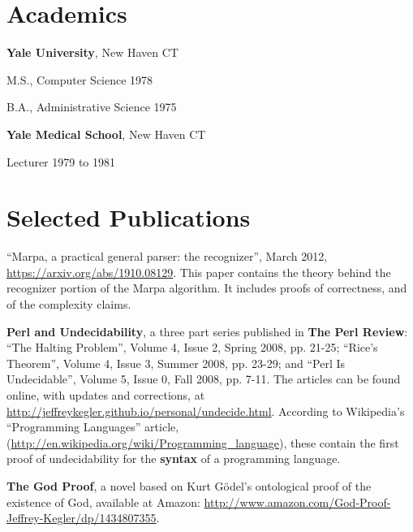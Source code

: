 \documentclass[12pt,margin,line]{res}
\newcommand{\internalskip}{\vspace{-.15in}}
\newenvironment{mylist}{
  \begin{list}{}
  {%
      \setlength{\itemsep}{0in}%
      \setlength{\leftmargin}{0.2in}%
      \setlength{\parsep}{0in}%
      \setlength{\parskip}{0in}%
      \setlength{\partopsep}{0in}%
      \setlength{\topsep}{0in}%
  }
}
{\end{list}}
\begin{document}
\address{\url{http:://jeffreykegler.github.io/personal/}}

\begin{resume}

\section{\sc Academics}
{\bf Yale University}, New Haven CT
\begin{mylist}
\item[] M.S., Computer Science \hfill  1978
\item[] B.A., Administrative Science \hfill  1975
\end{mylist}

\internalskip
{\bf Yale Medical School}, New Haven CT
\begin{mylist}
\item[] Lecturer \hfill 1979 to 1981\\
\end{mylist}
\vspace{-.2in}

\section{\sc Selected Publications}

``Marpa, a practical general parser: the recognizer'',
March 2012,
\url{https://arxiv.org/abs/1910.08129}.
This paper contains the theory behind the
recognizer portion of the
Marpa algorithm.
It includes proofs of correctness, and of the complexity claims.

{\bf Perl and Undecidability}, a three part series published
in {\bf The Perl Review}:
``The Halting Problem'', Volume 4, Issue 2, Spring 2008, pp. 21-25;
``Rice's Theorem'', Volume 4, Issue 3, Summer 2008, pp. 23-29; and
``Perl Is Undecidable'', Volume 5, Issue 0, Fall 2008, pp. 7-11.
The articles can be found online, with updates and corrections,
at \url{http://jeffreykegler.github.io/personal/undecide.html}.
According to Wikipedia's ``Programming Languages'' article,
(\url{http://en.wikipedia.org/wiki/Programming_language}),
these contain the first proof of undecidability for the {\bf syntax}
of a programming language.

{\bf The God Proof},
a novel based on Kurt G\"{o}del's
ontological proof of the existence
of God,
available at Amazon:
\url{http://www.amazon.com/God-Proof-Jeffrey-Kegler/dp/1434807355}.


\end{resume}
\end{document}
